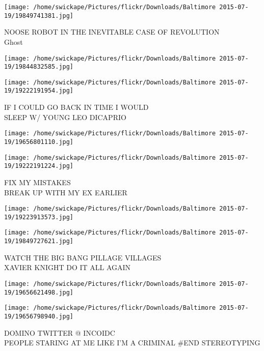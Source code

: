 \documentclass[10pt,letterpaper]{article}
\begin{document}
\vspace{0.25in}
\texttt{[image: /home/swickape/Pictures/flickr/Downloads/Baltimore 2015-07-19/19849741381.jpg]}

NOOSE ROBOT IN THE INEVITABLE CASE OF REVOLUTION\\
Ghost\\
\pagebreak

\texttt{[image: /home/swickape/Pictures/flickr/Downloads/Baltimore 2015-07-19/19844832585.jpg]}

\vspace{0.25in}
\texttt{[image: /home/swickape/Pictures/flickr/Downloads/Baltimore 2015-07-19/19222191954.jpg]}

IF I COULD GO BACK IN TIME I WOULD\\
SLEEP W/ YOUNG LEO DICAPRIO\\
\pagebreak

\texttt{[image: /home/swickape/Pictures/flickr/Downloads/Baltimore 2015-07-19/19656801110.jpg]}

\vspace{0.25in}
\texttt{[image: /home/swickape/Pictures/flickr/Downloads/Baltimore 2015-07-19/19222191224.jpg]}

FIX MY MISTAKES\\
BREAK UP WITH MY EX EARLIER\\
\pagebreak

\texttt{[image: /home/swickape/Pictures/flickr/Downloads/Baltimore 2015-07-19/19223913573.jpg]}

\vspace{0.25in}
\texttt{[image: /home/swickape/Pictures/flickr/Downloads/Baltimore 2015-07-19/19849727621.jpg]}

WATCH THE BIG BANG PILLAGE VILLAGES\\
XAVIER KNIGHT DO IT ALL AGAIN\\
\pagebreak

\texttt{[image: /home/swickape/Pictures/flickr/Downloads/Baltimore 2015-07-19/19656621498.jpg]}

\vspace{0.25in}
\texttt{[image: /home/swickape/Pictures/flickr/Downloads/Baltimore 2015-07-19/19656798940.jpg]}

DOMINO TWITTER @ INCOIDC\\
PEOPLE STARING AT ME LIKE I'M A CRIMINAL \#END STEREOTYPING\\
\pagebreak
\end{document}
